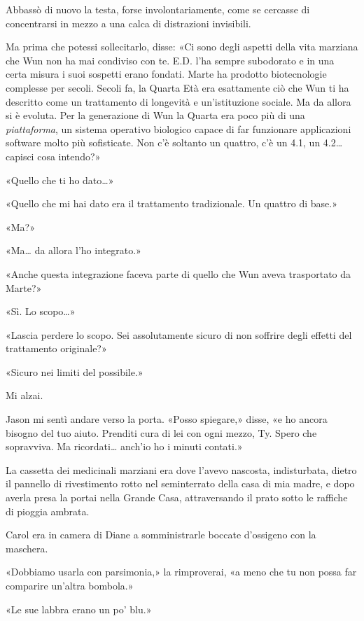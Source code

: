 Abbassò di nuovo la testa, forse involontariamente, come se cercasse di
concentrarsi in mezzo a una calca di distrazioni invisibili.

Ma prima che potessi sollecitarlo, disse: «Ci sono degli aspetti della
vita marziana che Wun non ha mai condiviso con te. E.D. l'ha sempre
subodorato e in una certa misura i suoi sospetti erano fondati. Marte ha
prodotto biotecnologie complesse per secoli. Secoli fa, la Quarta Età
era esattamente ciò che Wun ti ha descritto come un trattamento di
longevità e un'istituzione sociale. Ma da allora si è evoluta. Per la
generazione di Wun la Quarta era poco più di una \emph{piattaforma}, un
sistema operativo biologico capace di far funzionare applicazioni
software molto più sofisticate. Non c'è soltanto un quattro, c'è un 4.1,
un 4.2\ldots{} capisci cosa intendo?»

«Quello che ti ho dato\ldots»

«Quello che mi hai dato era il trattamento tradizionale. Un quattro di
base.»

«Ma?»

«Ma\ldots{} da allora l'ho integrato.»

«Anche questa integrazione faceva parte di quello che Wun aveva
trasportato da Marte?»

«Sì. Lo scopo\ldots»

«Lascia perdere lo scopo. Sei assolutamente sicuro di non soffrire degli
effetti del trattamento originale?»

«Sicuro nei limiti del possibile.»

Mi alzai.

Jason mi sentì andare verso la porta. «Posso spiegare,» disse, «e ho
ancora bisogno del tuo aiuto. Prenditi cura di lei con ogni mezzo, Ty.
Spero che sopravviva. Ma ricordati\ldots{} anch'io ho i minuti contati.»

\separatorefiori

La cassetta dei medicinali marziani era dove l'avevo nascosta,
indisturbata, dietro il pannello di rivestimento rotto nel seminterrato
della casa di mia madre, e dopo averla presa la portai nella Grande
Casa, attraversando il prato sotto le raffiche di pioggia ambrata.

Carol era in camera di Diane a somministrarle boccate d'ossigeno con la
maschera.

«Dobbiamo usarla con parsimonia,» la rimproverai, «a meno che tu non
possa far comparire un'altra bombola.»

«Le sue labbra erano un po' blu.»

